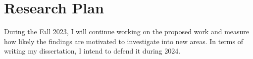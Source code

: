 
\section{Research Plan}
\label{sec:researchPlan}

During the Fall 2023, I will continue working on the proposed work and measure how likely the findings are motivated to investigate into new areas. In terms of writing my dissertation, I intend to defend it during 2024. 